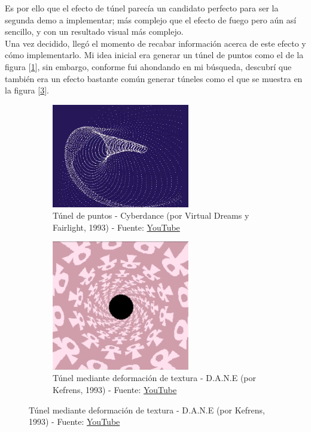 Es por ello que el efecto de túnel parecía un candidato perfecto para ser la segunda demo a implementar; más complejo que el efecto de fuego pero aún así sencillo, y con un resultado visual más complejo.\\

Una vez decidido, llegó el momento de recabar información acerca de este efecto y cómo implementarlo. Mi idea inicial era generar un túnel de puntos como el de la figura [\ref{fig:cyberdance}], sin embargo, conforme fui ahondando en mi búsqueda, descubrí que también era un efecto bastante común generar túneles como el que se muestra en la figura [\ref{fig:dane_kefrens}].\\ 

\begin{figure}[h]
	\centering
	\begin{subfigure}[b]{0.45\textwidth}
		\centering
		\includegraphics[width=6cm]{archivos/cyberdance}
		\caption{Túnel de puntos - Cyberdance (por Virtual Dreams y Fairlight, 1993) - Fuente: \href{https://www.youtube.com/watch?v=X7sHODKip_c}{YouTube}}
		\label{fig:cyberdance}
	\end{subfigure}
	\begin{subfigure}[b]{0.45\textwidth}
		\centering
		\includegraphics[width=6cm]{archivos/dane_kefrens}
		\caption{Túnel mediante deformación de textura - D.A.N.E (por Kefrens, 1993) - Fuente: \href{https://www.youtube.com/watch?v=ZbPGU5p7O4Y}{YouTube}}
		\label{fig:dane_kefrens}
	\end{subfigure}
\end{figure}

